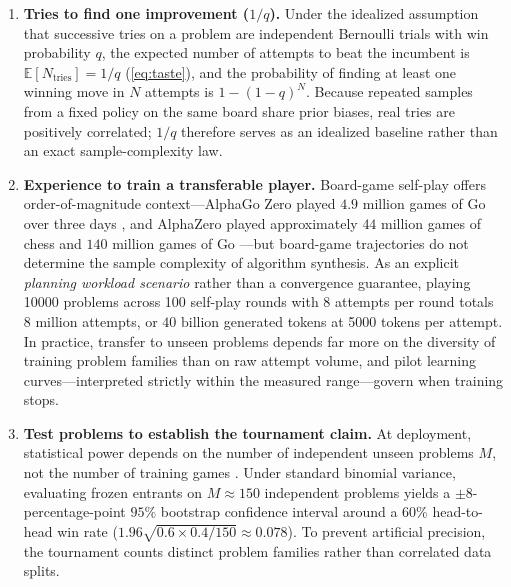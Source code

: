 \begin{enumerate}
  \item \textbf{Tries to find one improvement ($1/q$).} Under the idealized assumption that successive tries on a problem are independent Bernoulli trials with win probability $q$, the expected number of attempts to beat the incumbent is $\mathbb{E}[N_{\text{tries}}] = 1/q$ (\cref{eq:taste}), and the probability of finding at least one winning move in $N$ attempts is $1 - (1 - q)^N$. Because repeated samples from a fixed policy on the same board share prior biases, real tries are positively correlated; $1/q$ therefore serves as an idealized baseline rather than an exact sample-complexity law.
  \item \textbf{Experience to train a transferable player.} Board-game self-play offers order-of-magnitude context---AlphaGo Zero played $4.9\text{ million}$ games of Go over three days \citep{silver2017mastering}, and AlphaZero played approximately $44\text{ million}$ games of chess and $140\text{ million}$ games of Go \citep{silver2018general}---but board-game trajectories do not determine the sample complexity of algorithm synthesis. As an explicit \emph{planning workload scenario} rather than a convergence guarantee, playing \num{10000} problems across \num{100} self-play rounds with $8$ attempts per round totals $8\text{ million}$ attempts, or $40\text{ billion}$ generated tokens at \num{5000} tokens per attempt. In practice, transfer to unseen problems depends far more on the diversity of training problem families than on raw attempt volume, and pilot learning curves---interpreted strictly within the measured range---govern when training stops.
  \item \textbf{Test problems to establish the tournament claim.} At deployment, statistical power depends on the number of independent unseen problems $M$, not the number of training games \citep{agarwal2021precipice}. Under standard binomial variance, evaluating frozen entrants on $M \approx 150$ independent problems yields a $\pm 8$-percentage-point $95\%$ bootstrap confidence interval around a $60\%$ head-to-head win rate ($1.96\sqrt{0.6 \times 0.4 / 150} \approx 0.078$). To prevent artificial precision, the tournament counts distinct problem families rather than correlated data splits.
\end{enumerate}

